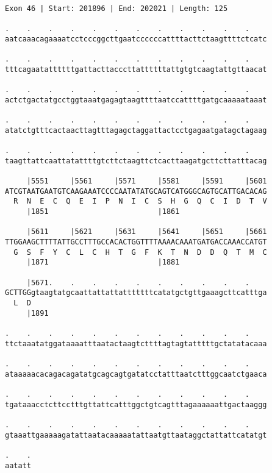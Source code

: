 \documentclass{article}
\begin{document}
\begin{Verbatim}[fontfamily=courier]
Exon 46 | Start: 201896 | End: 202021 | Length: 125

.    .    .    .    .    .    .    .    .    .    .    .    
aatcaaacagaaaatcctcccggcttgaatccccccattttacttctaagttttctcatc

.    .    .    .    .    .    .    .    .    .    .    .    
tttcagaatattttttgattacttacccttattttttattgtgtcaagtattgttaacat

.    .    .    .    .    .    .    .    .    .    .    .    
actctgactatgcctggtaaatgagagtaagttttaatccattttgatgcaaaaataaat

.    .    .    .    .    .    .    .    .    .    .    .    
atatctgtttcactaacttagtttagagctaggattactcctgagaatgatagctagaag

.    .    .    .    .    .    .    .    .    .    .    .    
taagttattcaattatattttgtcttctaagttctcacttaagatgcttcttatttacag

     |5551     |5561     |5571     |5581     |5591     |5601
ATCGTAATGAATGTCAAGAAATCCCCAATATATGCAGTCATGGGCAGTGCATTGACACAG
  R  N  E  C  Q  E  I  P  N  I  C  S  H  G  Q  C  I  D  T  V
     |1851                         |1861                    

     |5611     |5621     |5631     |5641     |5651     |5661
TTGGAAGCTTTTATTGCCTTTGCCACACTGGTTTTAAAACAAATGATGACCAAACCATGT
  G  S  F  Y  C  L  C  H  T  G  F  K  T  N  D  D  Q  T  M  C
     |1871                         |1881                    

     |5671.    .    .    .    .    .    .    .    .    .    
GCTTGGgtaagtatgcaattattattatttttttcatatgctgttgaaagcttcatttga
  L  D                                                      
     |1891                                                  

.    .    .    .    .    .    .    .    .    .    .    .    
ttctaaatatggataaaatttaatactaagtcttttagtagtatttttgctatatacaaa

.    .    .    .    .    .    .    .    .    .    .    .    
ataaaaacacagacagatatgcagcagtgatatcctatttaatctttggcaatctgaaca

.    .    .    .    .    .    .    .    .    .    .    .    
tgataaacctcttcctttgttattcatttggctgtcagtttagaaaaaattgactaaggg

.    .    .    .    .    .    .    .    .    .    .    .    
gtaaattgaaaaagatattaatacaaaaatattaatgttaataggctattattcatatgt

.    .
aatatt
\end{Verbatim}
\newpage
\end{document}
